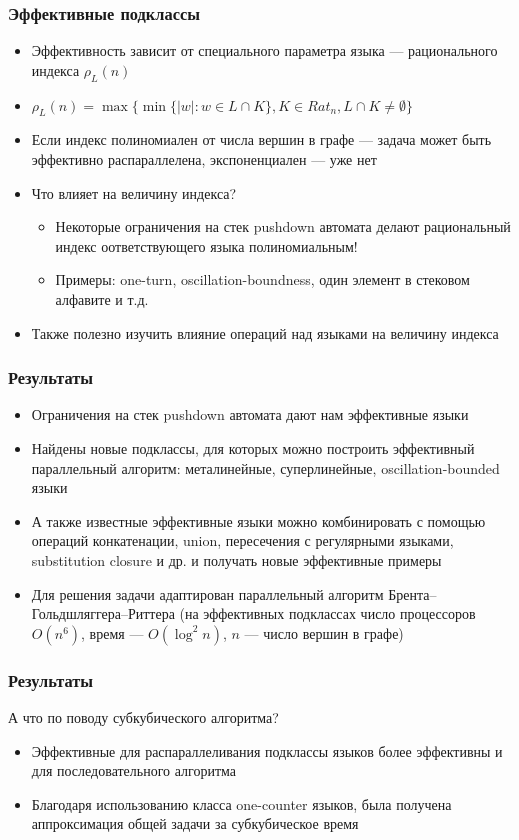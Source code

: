 \documentclass{beamer}
\begin{document}
\begin{frame}
\frametitle{Эффективные подклассы}
\begin{itemize}
\item Эффективность зависит от специального параметра языка --- рационального индекса  $\rho_L(n)$
\item $\rho_L(n) = \max\{\min\{|w|:w \in L \cap K\}, K \in {Rat}_n, L \cap K \neq \emptyset\}$
\item Если индекс полиномиален от числа вершин в графе --- задача может быть эффективно распараллелена, экспоненциален --- уже нет
\item Что влияет на величину индекса?
\begin{itemize}
\item Некоторые ограничения на стек pushdown автомата делают рациональный индекс оответствующего языка полиномиальным!
\item Примеры: one-turn, oscillation-boundness, один элемент в стековом алфавите и т.д.
\end{itemize}
\item Также полезно изучить влияние операций над языками на величину индекса
\end{itemize}
\end{frame}

\begin{frame}
\frametitle{Результаты}
\begin{itemize}
\item Ограничения на стек  pushdown автомата дают нам эффективные языки
\item Найдены новые подклассы, для которых можно построить эффективный параллельный алгоритм: металинейные, суперлинейные, oscillation-bounded языки
\item А также известные эффективные языки можно комбинировать с помощью операций конкатенации, union, пересечения с регулярными языками, substitution closure и др. и получать новые эффективные примеры
\item Для решения задачи адаптирован параллельный алгоритм Брента--Гольдшляггера--Риттера  (на эффективных подклассах число процессоров $O(n^6)$, время --- $O(\log^2 n)$, $n$ --- число вершин в графе)
\end{itemize}
\end{frame}

\begin{frame}
\frametitle{Результаты}
А что по поводу субкубического алгоритма?
\begin{itemize}
\item Эффективные для распараллеливания подклассы языков более эффективны и для последовательного алгоритма
\item Благодаря использованию класса one-counter языков, была получена аппроксимация общей задачи за субкубическое время
\end{itemize}
\end{frame}
\end{document}
